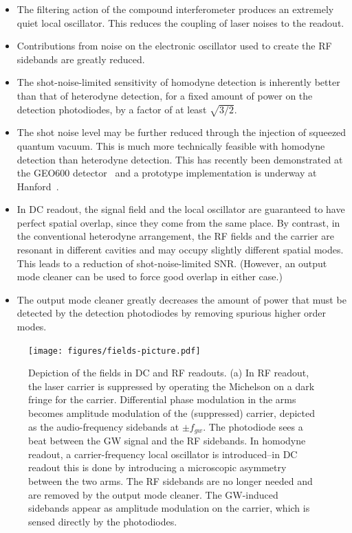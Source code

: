 \begin{itemize}
\item The filtering action of the compound interferometer produces an
  extremely quiet local oscillator.  This reduces the coupling of
  laser noises to the readout.
\item Contributions from noise on the electronic oscillator used to
  create the RF sidebands are greatly reduced.
\item The shot-noise-limited sensitivity of homodyne detection is
  inherently better than that of heterodyne detection, for a fixed
  amount of power on the detection photodiodes, by a factor of at
  least $\sqrt{3/2}$.
\item The shot noise level may be further reduced through the
  injection of squeezed quantum vacuum.  This is much more technically
  feasible with homodyne detection than heterodyne detection.  This
  has recently been demonstrated at the GEO600 detector~\cite{2011Gravitational,Vahlbruch2010GEO} and a
  prototype implementation is underway at Hanford~\cite{H1SqueezerProposal}.
\item In DC readout, the signal field and the local oscillator are
  guaranteed to have perfect spatial overlap, since they come from the
  same place.  By contrast, in the conventional heterodyne
  arrangement, the RF fields and the carrier are resonant in different
  cavities and may occupy slightly different spatial modes.  This
  leads to a reduction of shot-noise-limited SNR.  (However, an output
  mode cleaner can be used to force good overlap in either case.)
\item The output mode cleaner greatly decreases the amount of power
  that must be detected by the detection photodiodes by removing
  spurious higher order modes.    
\end{itemize}

\begin{figure}[p]
\texttt{[image: figures/fields-picture.pdf]}
\caption[Frequency-domain fields in DC and RF
  readouts]{\label{fig:sideband-picture}Depiction of the fields in DC
  and RF readouts.  (a) In RF readout, the laser carrier is suppressed
  by operating the Michelson on a dark fringe for the carrier.
  Differential phase modulation in the arms becomes amplitude
  modulation of the (suppressed) carrier, depicted as the
  audio-frequency sidebands at $\pm f_{gw}$.  The photodiode sees a
  beat between the GW signal and the RF sidebands.  In homodyne
  readout, a carrier-frequency local oscillator is introduced--in DC
  readout this is done by introducing a microscopic asymmetry between
  the two arms.  The RF sidebands are no longer needed and are removed
  by the output mode cleaner.  The GW-induced sidebands appear as
  amplitude modulation on the carrier, which is sensed directly by the
  photodiodes.}
\end{figure}


